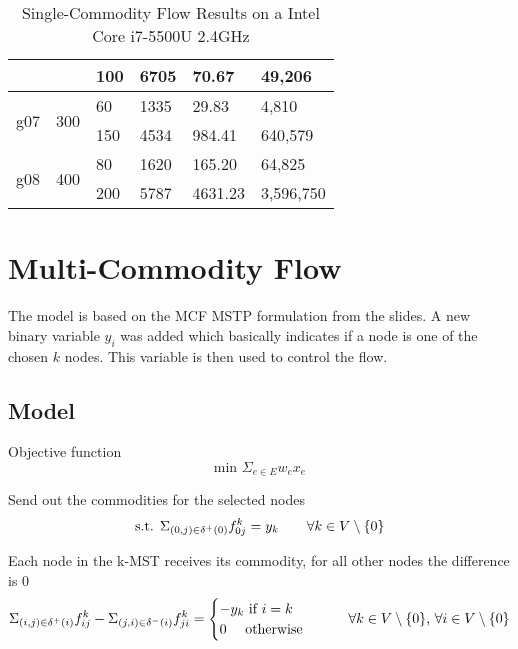 \documentclass{article}
\begin{document}
\begin{table}[h!]
\begin{tabular}{l|l|l|l|l|l}
							&                   	& 100        	& 6705               & 70.67                       & 49,206                                    \\ \hline
		\multirow{2}{*}{g07}& \multirow{2}{*}{300} 	& 60         	& 1335               & 29.83                       & 4,810                                     \\
							&                   	& 150        	& 4534               & 984.41                      & 640,579                                   \\ \hline
		\multirow{2}{*}{g08}& \multirow{2}{*}{400} 	& 80         	& 1620               & 165.20                      & 64,825                                    \\
							&                   	& 200        	& 5787               & 4631.23                     & 3,596,750                                  
	\end{tabular}
	\caption{Single-Commodity Flow Results on a Intel Core i7-5500U 2.4GHz}
\end{table}

\section{Multi-Commodity Flow}

The model is based on the MCF MSTP formulation from the slides. A new binary variable $y_i$ was added which basically indicates if a node is one of the chosen $k$ nodes. This variable is then used to control the flow.

\subsection{Model}
Objective function
\[\text{min } \Sigma_{e \in E} w_e x_e\]

\noindent
Send out the commodities for the selected nodes
\[\text{s.t. } \Sigma_{(0,j) \in \delta^+(0)} f_{0 j}^k = y_k \tag*{$\forall k \in V \setminus \{0\}$}\]

\noindent
Each node in the k-MST receives its commodity, for all other nodes the difference is $0$
\[ \Sigma_{(i,j) \in \delta^+(i)} f_{i j}^k - \Sigma_{(j,i) \in \delta^-(i)} f_{j i}^k = 
\begin{cases}
-y_k\ \text{if } i = k\\
0\ \quad\text{otherwise}\\
\end{cases}
\tag*{$\forall k \in V \setminus \{0\}$, $\forall i \in V \setminus \{0\}$}\]
\end{document}
